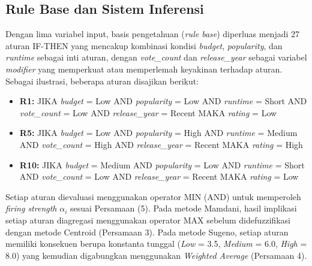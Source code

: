 \documentclass[11pt,a4paper]{article}
\begin{document}
\subsection{Rule Base dan Sistem Inferensi}
Dengan lima variabel input, basis pengetahuan (\textit{rule base}) diperluas menjadi 27 aturan IF-THEN yang mencakup kombinasi kondisi \textit{budget}, \textit{popularity}, dan \textit{runtime} sebagai inti aturan, dengan \textit{vote\_count} dan \textit{release\_year} sebagai variabel \textit{modifier} yang memperkuat atau memperlemah keyakinan terhadap aturan. Sebagai ilustrasi, beberapa aturan disajikan berikut:
\begin{itemize}
    \item \textbf{R1:} JIKA \textit{budget} = Low AND \textit{popularity} = Low AND \textit{runtime} = Short AND \textit{vote\_count} = Low AND \textit{release\_year} = Recent MAKA \textit{rating} = Low
    \item \textbf{R5:} JIKA \textit{budget} = Low AND \textit{popularity} = High AND \textit{runtime} = Medium AND \textit{vote\_count} = High AND \textit{release\_year} = Recent MAKA \textit{rating} = High
    \item \textbf{R10:} JIKA \textit{budget} = Medium AND \textit{popularity} = Low AND \textit{runtime} = Short AND \textit{vote\_count} = Low AND \textit{release\_year} = Recent MAKA \textit{rating} = Low
\end{itemize}

Setiap aturan dievaluasi menggunakan operator MIN (AND) untuk memperoleh \textit{firing strength} $\alpha_i$ sesuai Persamaan (5). Pada metode Mamdani, hasil implikasi setiap aturan diagregasi menggunakan operator MAX sebelum didefuzzifikasi dengan metode Centroid (Persamaan 3). Pada metode Sugeno, setiap aturan memiliki konsekuen berupa konstanta tunggal (\textit{Low} = 3.5, \textit{Medium} = 6.0, \textit{High} = 8.0) yang kemudian digabungkan menggunakan \textit{Weighted Average} (Persamaan 4).
\end{document}
